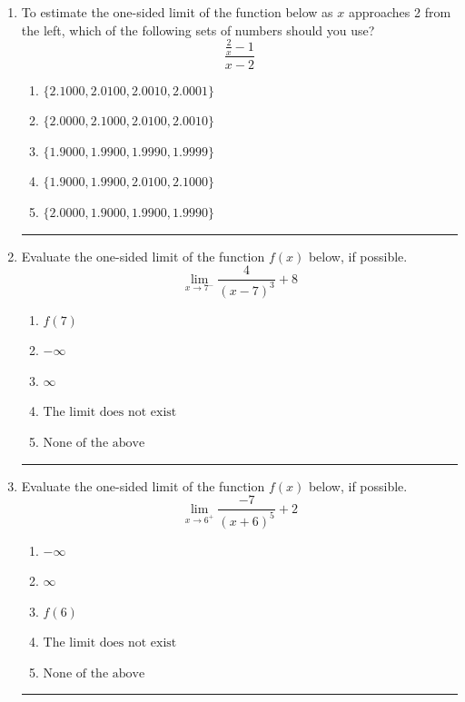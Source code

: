\documentclass[14pt]{extbook}
\newcommand{\litem}[1]{\item#1\hspace*{-1cm}\rule{\textwidth}{0.4pt}}
\begin{document}
\begin{enumerate}
\litem{
To estimate the one-sided limit of the function below as $x$ approaches 2 from the left, which of the following sets of numbers should you use?\[ \frac{\frac{2}{x} - 1}{x - 2} \]\begin{enumerate}[label=\Alph*.]
\item \( \{ 2.1000, 2.0100, 2.0010, 2.0001 \} \)
\item \( \{ 2.0000, 2.1000, 2.0100, 2.0010 \} \)
\item \( \{ 1.9000, 1.9900, 1.9990, 1.9999 \} \)
\item \( \{ 1.9000, 1.9900, 2.0100, 2.1000 \} \)
\item \( \{ 2.0000, 1.9000, 1.9900, 1.9990 \} \)

\end{enumerate} }
\litem{
Evaluate the one-sided limit of the function $f(x)$ below, if possible.\[ \lim_{x \rightarrow 7^-} \frac{4}{(x-7)^3}+8 \]\begin{enumerate}[label=\Alph*.]
\item \( f(7) \)
\item \( -\infty \)
\item \( \infty \)
\item \( \text{The limit does not exist} \)
\item \( \text{None of the above} \)

\end{enumerate} }
\litem{
Evaluate the one-sided limit of the function $f(x)$ below, if possible.\[ \lim_{x \rightarrow 6^+} \frac{-7}{(x+6)^5}+2 \]\begin{enumerate}[label=\Alph*.]
\item \( -\infty \)
\item \( \infty \)
\item \( f(6) \)
\item \( \text{The limit does not exist} \)
\item \( \text{None of the above} \)


\end{enumerate}}
\end{enumerate}
\end{document}
